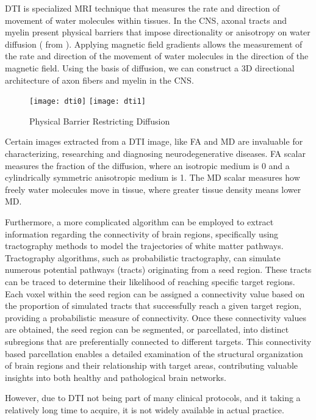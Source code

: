 \ac{DTI} is specialized \ac{MRI} technique that measures the rate and direction of movement of water molecules within tissues. In the \ac{CNS}, axonal tracts and myelin present physical barriers that impose directionality or anisotropy on water diffusion ( from \cite{dti}). Applying magnetic field gradients allows the measurement of the rate and direction of the movement of water molecules in the direction of the magnetic field. Using the basis of diffusion, we can construct a 3D directional architecture of axon fibers and myelin in the \ac{CNS}. \cite{dti}
\begin{figure}[H]
\centering
\texttt{[image: dti0]}
\texttt{[image: dti1]}
\caption{Physical Barrier Restricting Diffusion}
\label{fig:dti}
\end{figure}
Certain images extracted from a \ac{DTI} image, like \ac{FA} and \ac{MD} are invaluable for characterizing, researching and diagnosing neurodegenerative diseases. \ac{FA} scalar measures the fraction of the diffusion, where an isotropic medium is 0 and a cylindrically symmetric anisotropic medium is 1. The \ac{MD} scalar measures how freely water molecules move in tissue, where greater tissue density means lower \ac{MD}. \cite{rd}\par
Furthermore, a more complicated algorithm can be employed to extract information regarding the connectivity of brain regions, specifically using tractography methods to model the trajectories of white matter pathways. Tractography algorithms, such as probabilistic tractography, can simulate numerous potential pathways (tracts) originating from a seed region. These tracts can be traced to determine their likelihood of reaching specific target regions. Each voxel within the seed region can be assigned a connectivity value based on the proportion of simulated tracts that successfully reach a given target region, providing a probabilistic measure of connectivity. Once these connectivity values are obtained, the seed region can be segmented, or parcellated, into distinct subregions that are preferentially connected to different targets. This connectivity based parcellation enables a detailed examination of the structural organization of brain regions and their relationship with target areas, contributing valuable insights into both healthy and pathological brain networks. \cite{tract} \cite{tract2}\par
However, due to \ac{DTI} not being part of many clinical protocols, and it taking a relatively long time to acquire, it is not widely available in actual practice.

